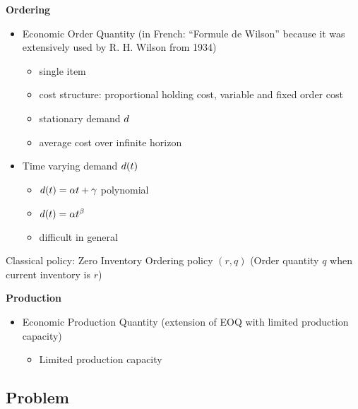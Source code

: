 \medskip

\textbf{Ordering}

\begin{itemize}
  \item \cite{Harris1913} Economic Order Quantity (in French: ``Formule de Wilson'' because it was extensively used by R. H. Wilson from 1934)
  \begin{itemize}
    \item single item
    \item cost structure: proportional holding cost, variable and fixed order cost
    \item stationary demand $d$
    \item average cost over infinite horizon
  \end{itemize}
  \item Time varying demand $d(t)$
  \begin{itemize}
    \item \cite{Resh1976,Donaldson1977} $d(t)=\alpha t+\gamma$ polynomial
    \item \cite{Barbosa1978} $d(t)=\alpha t^{\beta}$
    \item difficult in general
  \end{itemize}
\end{itemize}

Classical policy: Zero Inventory Ordering policy $(r,q)$ (Order quantity $q$ when current inventory is $r$)

\medskip

\textbf{Production}

\begin{itemize}
  \item Economic Production Quantity (extension of EOQ with limited production capacity) \cite{Taft1918}
  \begin{itemize}
    \item Limited production capacity
  \end{itemize}
\end{itemize}


\medskip


\medskip


\subsection{Problem}

\label{sec:prob-cont-rev}

